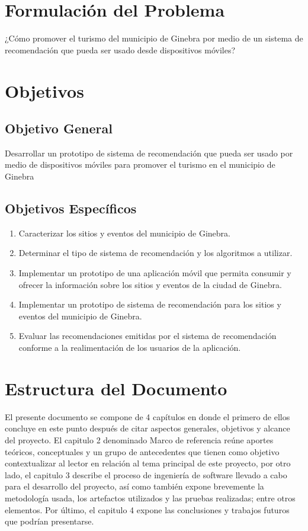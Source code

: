 \documentclass[12pt,letterpaper,openany]{book}
\begin{document}
\section{Formulación del Problema}
¿Cómo promover el turismo del municipio de Ginebra por medio de un sistema de recomendación que pueda ser usado desde dispositivos móviles?

\section{Objetivos}
\subsection{Objetivo General}
Desarrollar un prototipo de sistema de recomendación que pueda ser usado por medio de dispositivos móviles para promover el turismo en el municipio de Ginebra
\subsection{Objetivos Específicos}
\begin{enumerate}
    \item Caracterizar los sitios y eventos del municipio de Ginebra.
    \item Determinar el tipo de sistema de recomendación y los algoritmos a utilizar.
    \item Implementar un prototipo de una aplicación móvil que permita consumir y ofrecer la información sobre los sitios y eventos de la ciudad de Ginebra.
    \item Implementar un prototipo de sistema de recomendación para los sitios y eventos del municipio de Ginebra.
    \item Evaluar las recomendaciones emitidas por el sistema de recomendación conforme a la realimentación de los usuarios de la aplicación.
\end{enumerate}

\section{Estructura del Documento}
El presente documento se compone de 4 capítulos en donde el primero de ellos concluye en este punto después de citar aspectos generales, objetivos y alcance del proyecto. El capitulo 2 denominado Marco de referencia reúne aportes teóricos, conceptuales y un grupo de antecedentes que tienen como objetivo contextualizar al lector en relación al tema principal de este proyecto, por otro lado, el capitulo 3 describe el proceso de ingeniería de software llevado a cabo para el desarrollo del proyecto, así como también expone brevemente la metodología usada, los artefactos utilizados y las pruebas realizadas; entre otros elementos. Por último, el capitulo 4 expone las conclusiones y trabajos futuros que podrían presentarse.
\end{document}
